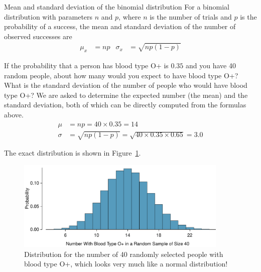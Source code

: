 \begin{onebox}{Mean and standard deviation of the binomial distribution}
For a binomial distribution with parameters $n$ and $p$, where $n$ is the number of trials and $p$ is the probability of a success, the mean and standard deviation of the number of observed successes are\vspace{-2mm}
\begin{align*}
\mu_x &= np
	&\sigma_x &= \sqrt{np(1-p)}
\end{align*}
\end{onebox}

\begin{examplewrap}
\begin{nexample}{If the probability that a person has blood type O+ is $0.35$ and you have 40 random people, about how many would you expect to have blood type O+? What is the standard deviation of the number of people who would have blood type O+?}
We are asked to determine the expected number (the mean) and the standard deviation, both of which can be directly computed from the formulas above. 
 \begin{align*}
\mu&=np = 40\times 0.35 = 14 \\
 \sigma &= \sqrt{np(1-p)} = \sqrt{40\times 0.35\times 0.65} = 3.0
\end{align*}
\end{nexample}
\end{examplewrap}

The exact distribution is shown in Figure~\ref{oPositive40}.

\begin{figure}[ht]
\centering
\includegraphics[width=0.9\textwidth]{ch_distributions/figures/oPositive40/oPositive40}
\caption{Distribution for the number of 40 randomly selected people with blood type O+, which looks very much like a normal distribution!} %
\label{oPositive40}
\end{figure}


